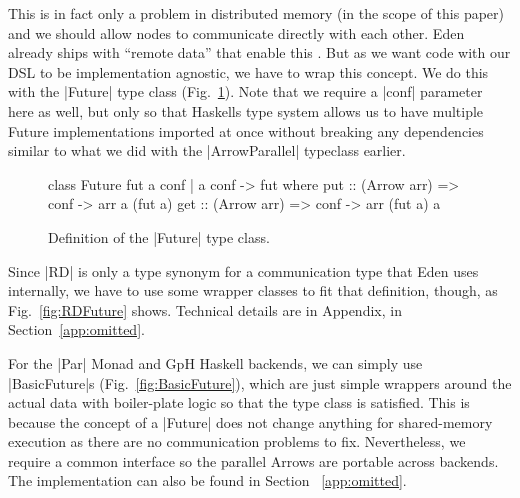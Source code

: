 This is in fact only a problem in distributed memory (in the scope of this paper) and we should allow nodes to communicate directly with each other. Eden already ships with \enquote{remote data} that enable this \cite{AlGo03a,Dieterle2010}.
But as we want code with our DSL to be implementation agnostic, we have to wrap this concept. We do this with the |Future| type class (Fig.~\ref{fig:future}). Note that we require a |conf| parameter here as well, but only so that Haskells type system allows us to have multiple Future implementations imported at once without breaking any dependencies similar to what we did with the |ArrowParallel| typeclass earlier.
\begin{figure}[h]
\begin{code}
class Future fut a conf | a conf -> fut where
    put :: (Arrow arr) => conf -> arr a (fut a)
    get :: (Arrow arr) => conf -> arr (fut a) a
\end{code}
\caption{Definition of the |Future| type class.}
\label{fig:future}
\end{figure}
Since |RD| is only a type synonym for a communication type that Eden uses internally, we have to use some wrapper classes to fit that definition, though, as Fig.~\ref{fig:RDFuture} shows. %
Technical details are in Appendix, in Section~\ref{app:omitted}.

For the |Par| Monad and GpH Haskell backends, we can simply use |BasicFuture|s (Fig.~\ref{fig:BasicFuture}), which are just simple wrappers around the actual data with boiler-plate logic so that the type class is satisfied. This is because the concept of a |Future| does not change anything for shared-memory execution as there are no communication problems to fix. Nevertheless, we require a common interface so the parallel Arrows are portable across backends. The implementation can also be found in Section ~\ref{app:omitted}.

